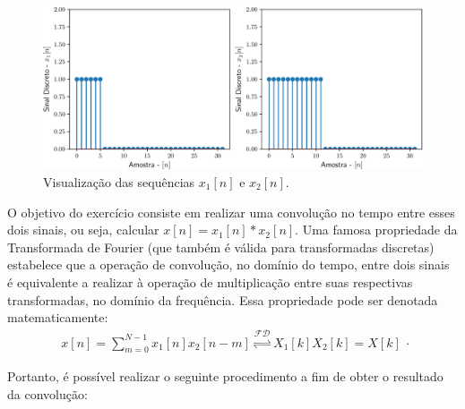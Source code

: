 \documentclass[a4paper,11pt]{article}
\numberwithin{figure}{section}
\numberwithin{equation}{section}
\numberwithin{table}{section}
\theoremstyle{definition}
\begin{document}
\begin{figure}[ht] \centering
	\includegraphics[width=\textwidth]{windows}
	\caption{Visualização das sequências $x_1[n]$ e $x_2[n]$.}
	\label{fig:windows}
\end{figure}

O objetivo do exercício consiste em realizar uma convolução no tempo entre esses dois sinais, ou seja, calcular $x[n] = x_1[n]*x_2[n]$. Uma famosa propriedade da Transformada de Fourier (que também é válida para transformadas discretas) estabelece que a operação de convolução, no domínio do tempo, entre dois sinais é equivalente a realizar à operação de multiplicação entre suas respectivas transformadas, no domínio da frequência. Essa propriedade pode ser denotada matematicamente:
\begin{equation}
\begin{matrix}
	x[n] = \displaystyle\sum_{m=0}^{N-1} x_1[n] x_2[n-m] \overset{\mathcal{FD}}{\rightleftharpoons} X_1[k] X_2[k] = X[k]
\end{matrix}.
\end{equation}

Portanto, é possível realizar o seguinte procedimento a fim de obter o resultado da convolução:
\end{document}
